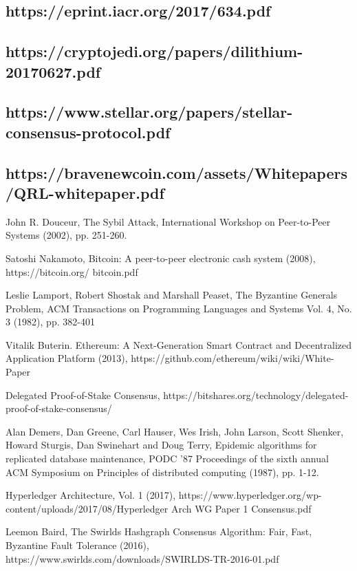 \documentclass[11pt]{article}
\begin{document}
\subsection{https://eprint.iacr.org/2017/634.pdf}

\subsection{https://cryptojedi.org/papers/dilithium-20170627.pdf}

\subsection{https://www.stellar.org/papers/stellar-consensus-protocol.pdf}

\subsection{https://bravenewcoin.com/assets/Whitepapers/QRL-whitepaper.pdf}

John R. Douceur, The Sybil Attack, International Workshop on Peer-to-Peer Systems (2002), pp. 251-260.


Satoshi Nakamoto, Bitcoin: A peer-to-peer electronic cash system (2008), https://bitcoin.org/ bitcoin.pdf


Leslie Lamport, Robert Shostak and Marshall Peaset, The Byzantine Generals Problem, ACM Transactions on Programming Languages and Systems Vol. 4, No. 3 (1982), pp. 382-401


Vitalik Buterin. Ethereum: A Next-Generation Smart Contract and Decentralized Application Platform (2013), https://github.com/ethereum/wiki/wiki/White-Paper


Delegated Proof-of-Stake Consensus, https://bitshares.org/technology/delegated-proof-of-stake-consensus/


Alan Demers, Dan Greene, Carl Hauser, Wes Irish, John Larson, Scott Shenker, Howard Sturgis, Dan Swinehart and Doug Terry, Epidemic algorithms for replicated database maintenance, PODC '87 Proceedings of the sixth annual ACM Symposium on Principles of distributed computing (1987), pp. 1-12.


Hyperledger Architecture, Vol. 1 (2017), https://www.hyperledger.org/wp-content/uploads/2017/08/Hyperledger Arch WG Paper 1 Consensus.pdf


Leemon Baird, The Swirlds Hashgraph Consensus Algorithm: Fair, Fast, Byzantine Fault Tolerance (2016), https://www.swirlds.com/downloads/SWIRLDS-TR-2016-01.pdf
\end{document}
